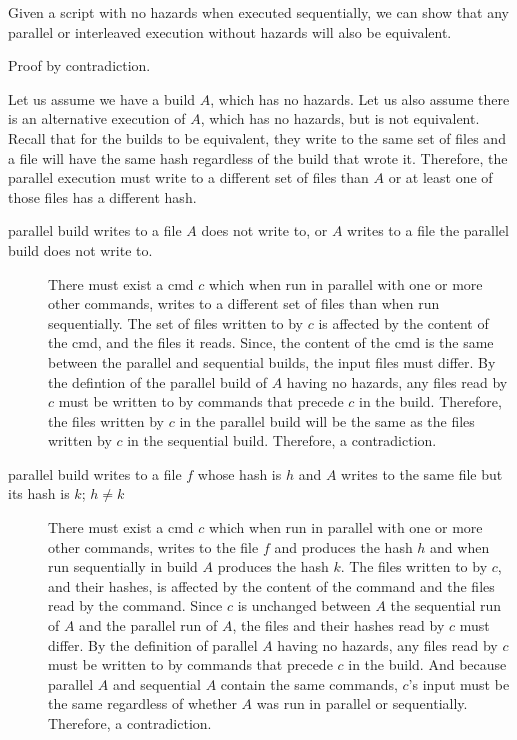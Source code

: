 Given a script with no hazards when executed sequentially, we can show that any parallel or interleaved execution without hazards will also be equivalent.

Proof by contradiction.

Let us assume we have a build $A$, which has no hazards.  Let us also assume there is an alternative execution of $A$, which has no hazards, but is not equivalent.
Recall that for the builds to be equivalent, they write to the same set of files and a file will have the same hash regardless of the build that wrote it.
Therefore, the parallel execution must write to a different set of files than $A$ or at least one of those files has a different hash.

\begin{description}
\item [parallel build writes to a file $A$ does not write to, or $A$ writes to a file the parallel build does not write to.]
  There must exist a cmd $c$ which when run in parallel with one or more other commands, writes to a different set of files than when run sequentially.  The set of files written to by $c$ is affected by the content of the cmd, and the files it reads.  Since, the content of the cmd is the same between the parallel and sequential builds, the input files must differ.
  By the defintion of the parallel build of $A$ having no hazards, any files read by $c$ must be written to by commands that precede $c$ in the build.  Therefore, the files written by $c$ in the parallel build will be the same as the files written by $c$ in the sequential build.  Therefore, a contradiction.

  
\item [parallel build writes to a file $f$ whose hash is $h$ and $A$ writes to the same file but its hash is $k$; $h \neq k$]
  There must exist a cmd $c$ which when run in parallel with one or more other commands, writes to the file $f$ and produces the hash $h$ and when run sequentially in build $A$ produces the hash $k$.
  The files written to by $c$, and their hashes, is affected by the content of the command and the files read by the command.  Since $c$ is unchanged between $A$ the sequential run of $A$ and the parallel run of $A$, the files and their hashes read by $c$ must differ.  By the definition of parallel $A$ having no hazards, any files read by $c$ must be written to by commands that precede $c$ in the build.  And because parallel $A$ and sequential $A$ contain the same commands, $c$'s input must be the same regardless of whether $A$ was run in parallel or sequentially.  Therefore, a contradiction.

\end{description}



